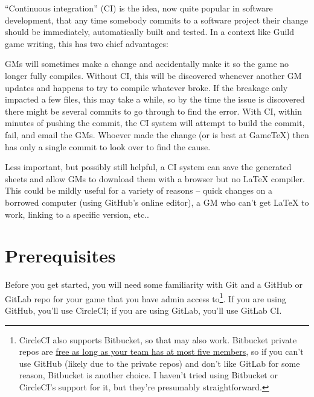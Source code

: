 \documentclass[green]{testgame}
\begin{document}
``Continuous integration'' (CI) is the idea, now quite popular in software development, that any time somebody commits to a software project their change should be immediately, automatically built and tested. In a context like Guild game writing, this has two chief advantages:
\begin{desc}
\item[Finding compile errors quickly] GMs will sometimes make a change and accidentally make it so the game no longer fully compiles. Without CI, this will be discovered whenever another GM updates and happens to try to compile whatever broke. If the breakage only impacted a few files, this may take a while, so by the time the issue is discovered there might be several commits to go through to find the error. With CI, within minutes of pushing the commit, the CI system will attempt to build the commit, fail, and email the GMs. Whoever made the change (or is best at GameTeX) then has only a single commit to look over to find the cause.
\item[Downloadable sheets without \LaTeX] Less important, but possibly still helpful, a CI system can save the generated sheets and allow GMs to download them with a browser but no \LaTeX{} compiler. This could be mildly useful for a variety of reasons -- quick changes on a borrowed computer (using GitHub's online editor), a GM who can't get \LaTeX{} to work, linking to a specific version, etc..
\end{desc}

\section{Prerequisites}

Before you get started, you will need some familiarity with Git and a GitHub or GitLab repo for your game that you have admin access to\footnote{CircleCI also supports Bitbucket, so that may also work. Bitbucket private repos are \href{https://bitbucket.org/product/pricing?tab=host-in-the-cloud}{free as long as your team has at most five members}, so if you can't use GitHub (likely due to the private repos) and don't like GitLab for some reason, Bitbucket is another choice. I haven't tried using Bitbucket or CircleCI's support for it, but they're presumably straightforward.}. If you are using GitHub, you'll use CircleCI; if you are using GitLab, you'll use GitLab CI.
\end{document}
